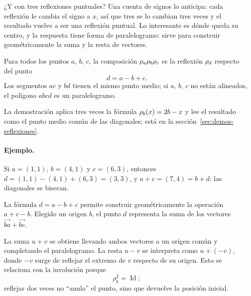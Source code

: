 ¿Y con tres reflexiones puntuales? Una cuenta de signos lo anticipa: cada reflexión le cambia
el signo a \(x\), así que tres se lo cambian tres veces y el resultado vuelve a ser una
reflexión puntual. Lo interesante es dónde queda su centro, y la respuesta tiene forma de
paralelogramo: sirve para construir geométricamente la suma y la resta de vectores.

\begin{proposicion}\label{prop:tres-puntuales}
Para todos los puntos \(a\), \(b\), \(c\), la composición \(\rho_{a}\rho_{b}\rho_{c}\) es la
reflexión \(\rho_{d}\) respecto del punto
\[
  \boxed{d=a-b+c}.
\]
Los segmentos \(ac\) y \(bd\) tienen el mismo punto medio; si \(a\), \(b\), \(c\) no están
alineados, el polígono \(abcd\) es un paralelogramo.
\end{proposicion}

La demostración aplica tres veces la fórmula \(\rho_{b}(x)=2b-x\) y lee el resultado como el
punto medio común de las diagonales; está en la sección~\ref{sec:demos-reflexiones}.

\begin{center}
\end{center}

\paragraph{Ejemplo.}
Si \(a=(1,1)\), \(b=(4,1)\) y \(c=(6,3)\), entonces \(d=(1,1)-(4,1)+(6,3)=(3,3)\), y
\(a+c=(7,4)=b+d\): las diagonales se bisecan.

\begin{idea}
La fórmula \(d=a-b+c\) permite construir geométricamente la operación
\(a+c-b\). Elegido un origen \(b\), el punto \(d\) representa la suma de los
vectores \(\overrightarrow{ba}+\overrightarrow{bc}\).

La suma \(u+v\) se obtiene llevando ambos vectores a un origen común y completando el
paralelogramo. La resta \(u-v\) se interpreta como \(u+(-v)\), donde \(-v\) surge de reflejar
el extremo de \(v\) respecto de su origen. Esto se relaciona con la involución porque
\[
  \rho_b^2=\operatorname{Id};
\]
reflejar dos veces no \enquote{anula} el punto, sino que devuelve la posición inicial.
\end{idea}

